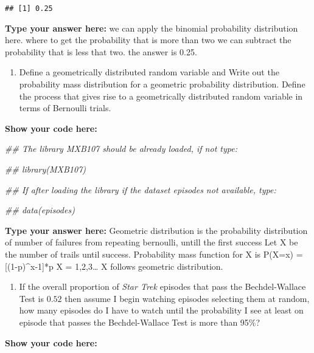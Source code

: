 \documentclass[
]{article}
\newenvironment{Shaded}{\begin{snugshade}}{\end{snugshade}}
\newcommand{\CommentTok}[1]{\textcolor[rgb]{0.56,0.35,0.01}{\textit{#1}}}
\providecommand{\tightlist}{%
  \setlength{\itemsep}{0pt}\setlength{\parskip}{0pt}}
\begin{document}
\begin{verbatim}
## [1] 0.25
\end{verbatim}

\textbf{Type your answer here:} we can apply the binomial probability
distribution here. where to get the probability that is more than two we
can subtract the probability that is less that two. the answer is 0.25.

\begin{enumerate}
\def\labelenumi{\alph{enumi}.}
\setcounter{enumi}{2}
\tightlist
\item
  Define a geometrically distributed random variable and Write out the
  probability mass distribution for a geometric probability
  distribution. Define the process that gives rise to a geometrically
  distributed random variable in terms of Bernoulli trials.
\end{enumerate}

\textbf{Show your code here:}

\begin{Shaded}
\begin{Highlighting}[]
\CommentTok{##  The library MXB107 should be already loaded, if not type:}

\CommentTok{##  library(MXB107)}

\CommentTok{##  If after loading the library if the dataset episodes not available, type:}

\CommentTok{##  data(episodes)}
\end{Highlighting}
\end{Shaded}

\textbf{Type your answer here:} Geometric distribution is the
probability distribution of number of failures from repeating bernoulli,
untill the first success Let X be the number of trails until success.
Probability mass function for X is P(X=x) = {[}(1-p)\^{}x-1{]}*p X =
1,2,3\ldots{} X follows geometric distribution.

\begin{enumerate}
\def\labelenumi{\alph{enumi}.}
\setcounter{enumi}{3}
\tightlist
\item
  If the overall proportion of \emph{Star Trek} episodes that pass the
  Bechdel-Wallace Test is \(0.52\) then assume I begin watching episodes
  selecting them at random, how many episodes do I have to watch until
  the probability I see at least on episode that passes the
  Bechdel-Wallace Test is more than 95\%?
\end{enumerate}

\textbf{Show your code here:}
\end{document}
